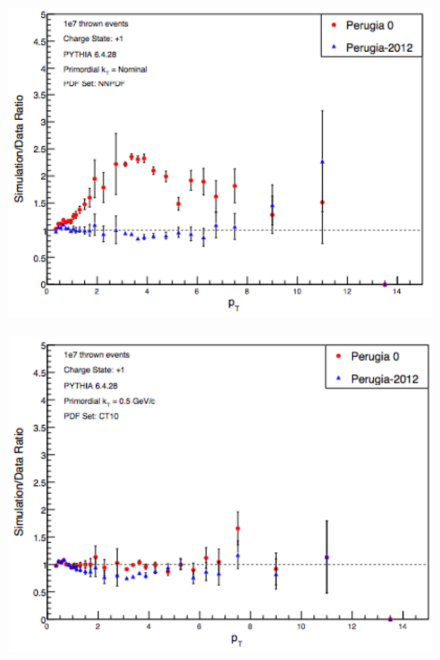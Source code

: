 \documentclass[abstract = on,listof=totoc, bibliography=totoc]{scrreprt}
\begin{document}
\begin{figure}
\caption{}
\label{fig:nominalPDFpythTunesBoth}
\end{figure}




\begin{figure}
\begin{center}
\includegraphics[width = .75\textwidth]{nominalKtPDFNNPDFPythTunes}
\caption[]{}
\label{fig:nominalKtPDFNNPDFPythTunes}
\end{center}
\end{figure}


\begin{figure}
\begin{center}
\includegraphics[width = .75\textwidth]{CT10PythTunes2}
\caption[]{}
\label{fig:CT10PythTunes2}
\end{center}
\end{figure}
\end{document}

